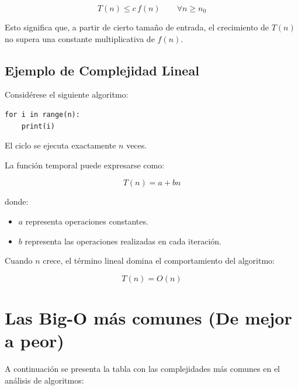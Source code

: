 \documentclass[12pt]{article}
\begin{document}
\[
T(n)\leq c\,f(n)
\qquad
\forall n \geq n_0
\]

Esto significa que, a partir de cierto tamaño de entrada, el crecimiento de \(T(n)\) no supera una constante multiplicativa de \(f(n)\).

\subsection{Ejemplo de Complejidad Lineal}

Considérese el siguiente algoritmo:

\begin{verbatim}
for i in range(n):
    print(i)
\end{verbatim}

El ciclo se ejecuta exactamente \(n\) veces.

La función temporal puede expresarse como:

\[
T(n)=a+bn
\]

donde:

\begin{itemize}
    \item \(a\) representa operaciones constantes.
    \item \(b\) representa las operaciones realizadas en cada iteración.
\end{itemize}

Cuando \(n\) crece, el término lineal domina el comportamiento del algoritmo:

\[
T(n)=O(n)
\]

\newpage

\section*{Las Big-O más comunes (De mejor a peor)}

A continuación se presenta la tabla con las complejidades más comunes en el análisis de algoritmos:
\end{document}
